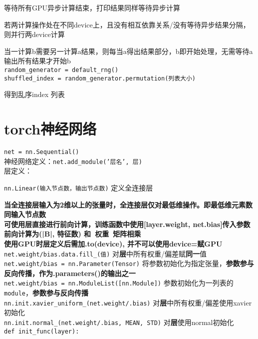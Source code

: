 \documentclass[UTF8]{ctexart}
\begin{document}
  等待所有GPU异步计算结束，打印结果同样等待异步计算
  
  若两计算操作处在不同device上，且没有相互依靠关系/没有等待异步结果分隔，则并行两device计算
  
  当一计算b需要另一计算a结果，则每当a得出结果部分，b即开始处理，无需等待a输出所有结果才开始b\\
\texttt{random\_generator = default\_rng()}\\
\texttt{shuffled\_index = random\_generator.permutation(列表大小)}

  得到乱序index 列表

\section{torch神经网络}
\noindent \texttt{net = nn.Sequential()}\\
神经网络定义：\texttt{net.add\_module('层名', 层)}\\
层定义：

  \texttt{nn.Linear(输入节点数，输出节点数)} 定义全连接层
  
  \quad \textbf{当全连接层输入为2维以上的张量时，全连接层仅对最低维操作。即最低维元素数同输入节点数}\\
\textbf{可使用层直接进行前向计算，训练函数中使用[layer.weight, net.bias]传入参数}\\
\textbf{前向计算为(|B|, 特征数) 和\ 权重\ 矩阵相乘}\\
\textbf{使用GPU时层定义后需加.to(device), 并不可以使用device=赋GPU}\\
\texttt{net.weight/bias.data.fill\_(值)} 对\textbf{层}中所有权重/偏差赋\textbf{同一}值\\
\texttt{net.weight/bias = nn.Parameter(Tensor)} 将参数初始化为指定张量，\textbf{参数参与反向传播，作为.parameters()的输出之一}\\
\texttt{net.weight/bias = nn.ModuleList([nn.Module])} 参数初始化为一列表的\texttt{module}，\textbf{参数参与反向传播}\\
\texttt{nn.init.xavier\_uniform\_(net.weight/.bias)} 对\textbf{层}中所有权重/偏差使用xavier初始化\\
\texttt{nn.init.normal\_(net.weight/.bias, MEAN, STD)} 对\textbf{层}使用normal初始化\\
\texttt{def init\_func(layer):}
\end{document}
